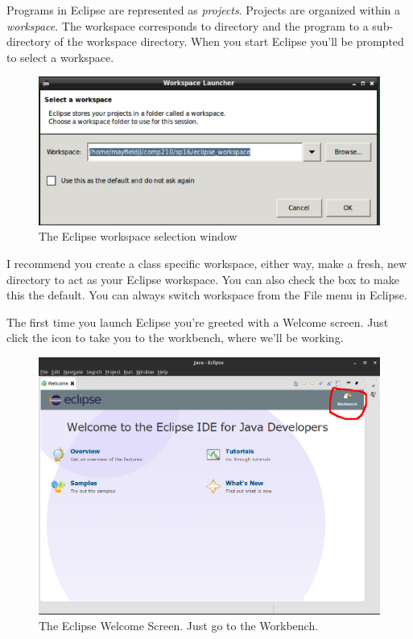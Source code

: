 \documentclass[]{tufte-handout}
\begin{document}
Programs in Eclipse are represented as \textit{projects}. Projects are organized within a \textit{workspace}. The workspace corresponds to directory and the program to a sub-directory of the workspace directory. When you start Eclipse you'll be prompted to select a workspace. 

\vspace{.1in}
\begin{center}
\begin{figure}
\includegraphics[scale=.5]{Eclipse-select-workspace.png}
\caption{The Eclipse workspace selection window} 
\end{figure}
\end{center}
\vspace{.1in}


I recommend you create a class specific workspace, either way, make a fresh, new directory to act as your Eclipse workspace. You can also check the box to make this the default. You can always switch workspace from the File menu in Eclipse. 

The first time you launch Eclipse you're greeted with a Welcome screen. Just click the icon to take you to the workbench, where we'll be working.

\vspace{.1in}
\begin{center}
\begin{figure}
\includegraphics[scale=.25]{Eclipse-Welcome.png}
\caption{The Eclipse Welcome Screen. Just go to the Workbench.} 
\end{figure}
\end{center}
\vspace{.1in}
\end{document}

